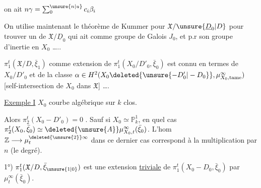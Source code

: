 on ait $n\gamma=\sum_{0}^{\unsure{n|u}} c_i\beta_i$

On utilise maintenant le théorème de Kummer pour $\mathfrak X/\unsure{\underline D_0|D}$ pour trouver
un  de $\mathfrak X/\underline D_0$ qui ait comme
groupe  de Galois $J_0$, et p.r son
groupe d'inertie en $X_0$ \ldots..


$\pi_1^t(\mathfrak X/D,\bar\xi_1)$ comme extension de $\pi_1^t(X_0/D'_0,\bar\xi_0)$
est connu  en termes de
$X_0/D'_0$ et de la classe $\alpha\in H^2(X_0\deleted{\unsure{-D'_0|-D_0}},\mu^\infty_{X_0,\mathrm{tame}})$
[self-intersection de $X_0$ dans $\mathfrak X$] \ldots.

\uline{Exemple I} $X_0$ courbe algébrique  sur $k$  clos.

Alors $\pi_2^t(X_0-D'_0)=0$ . Sauf si $X_0\simeq\mathbb P^1_k$, en quel
cas $\pi_2^t(X_0,\bar\xi_0)\simeq\deleted{\unsure{A}}\mu^\infty_{X_0,t}(\bar\xi_0)$. L'hom $\mathbb Z\longrightarrow\mu^{\deleted{\unsure{2}}\infty}_t$
dans ce dernier cas correspond  à la
multiplication par $n$ (le degré). 

1°)   $\pi_1^t(\mathfrak X/D,\bar\xi_{\unsure{1|0}})$ est une extension
\uline{triviale} de $\pi_1^t(X_0-D_0,\bar\xi_0)$ par $\mu^\infty_t(\bar\xi_0)$.
